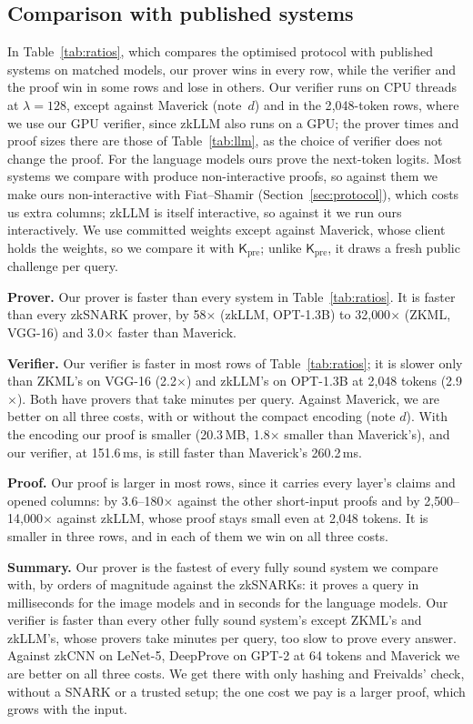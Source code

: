 \documentclass[sigconf,nonacm]{acmart}
\newcommand{\Kpre}{\mathsf{K}_{\mathrm{pre}}}
\newcommand{\para}[1]{\par\noindent\textbf{#1}\quad}
\begin{document}
\subsection{Comparison with published systems}
\label{sec:compare}

In Table~\ref{tab:ratios}, which compares the optimised protocol with published systems on
matched models, our prover wins in every row, while the verifier and the proof win in some rows
and lose in others. Our verifier runs on
\VerifierThreads{} CPU threads at $\lambda{=}128$, except against Maverick (note~$d$) and in the 2{,}048-token rows, where we use our GPU verifier,
since zkLLM also runs on a GPU; the prover times and proof sizes there are those of
Table~\ref{tab:llm}, as the choice of verifier does not change the proof. For the language models
ours prove the next-token logits. Most systems we compare with produce non-interactive proofs,
so against them we make ours non-interactive with Fiat--Shamir (Section~\ref{sec:protocol}),
which costs us extra columns; zkLLM is itself interactive, so against it we run ours
interactively. We use committed weights except against Maverick, whose client holds the weights, so we compare it with $\Kpre$; unlike $\Kpre$, it draws a fresh public challenge per query.

\para{Prover.} Our prover is faster than every system in Table~\ref{tab:ratios}. It is faster than every zkSNARK prover, by
58$\times$ (zkLLM, OPT-1.3B) to 32{,}000$\times$ (ZKML, VGG-16) and 3.0$\times$ faster than Maverick.

\para{Verifier.} Our verifier is faster in most rows of Table~\ref{tab:ratios}; it is
slower only than ZKML's on VGG-16 (2.2$\times$) and zkLLM's on OPT-1.3B
at 2{,}048 tokens (2.9$\times$). Both have provers that take minutes per query.
Against Maverick, we are better on all three costs, with or without the compact encoding (note $d$). With the encoding our proof is smaller (20.3\,MB, 1.8$\times$ smaller than Maverick's), and our verifier, at 151.6\,ms, is still faster than Maverick's 260.2\,ms. 

\para{Proof.} Our proof is larger in most rows, since it carries every layer's claims and opened columns: by
3.6--180$\times$ against the other short-input proofs and by 2{,}500--14{,}000$\times$ against
zkLLM, whose proof stays small even at 2{,}048 tokens. It is smaller in three rows, and in each of them we win on all three costs.

\para{Summary.} Our prover is the fastest of every fully sound system we compare with, by orders of magnitude
against the zkSNARKs: it proves a query in milliseconds for the image models and in seconds for
the language models. Our verifier is faster than every other fully sound system's except ZKML's and zkLLM's, whose provers take minutes per query, too slow to prove every answer.
Against zkCNN on LeNet-5, DeepProve on GPT-2 at 64 tokens and Maverick we are better on all three costs.
We get there with only hashing and Freivalds' check, without a SNARK or a trusted setup; the one
cost we pay is a larger proof, which grows with the input.
\end{document}
